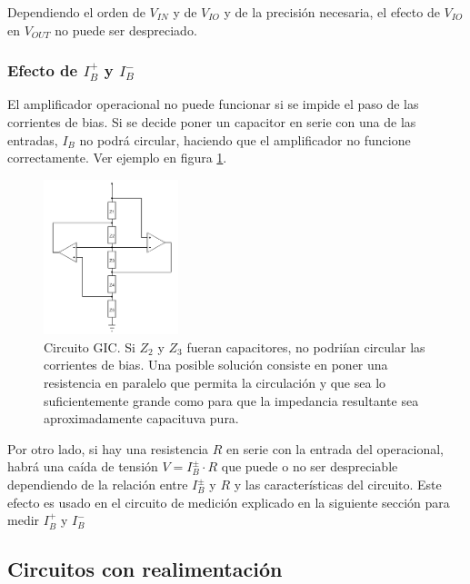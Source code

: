 \documentclass[../../main.tex]{subfiles}
\begin{document}
Dependiendo el orden de $V_{IN}$ y de $V_{IO}$ y de la precisi\'on necesaria, el efecto de $V_{IO}$ en $V_{OUT}$ no puede ser despreciado.

\subsubsection*{Efecto de $I_B^+$ y $I_B^-$}
El amplificador operacional no puede funcionar si se impide el paso de las corrientes de bias. Si se decide poner un capacitor en serie con una de las entradas, $I_B$ no podr\'a circular, haciendo que el amplificador no funcione correctamente. Ver ejemplo en figura \ref{fig:ej_3_GIC}. 

\begin{figure}[htb] %
	\centering
	\includegraphics[width=0.35\textwidth]{imagenes/gic.png}
	\caption[Capacitores en un GIC]{Circuito GIC. Si $Z_2$ y $Z_3$ fueran capacitores, no podri\'ian circular las corrientes de bias. Una posible soluci\'on consiste en poner una resistencia en paralelo que permita la circulaci\'on y que sea lo suficientemente grande como para que la impedancia resultante sea aproximadamente capacituva pura.}
	\label{fig:ej_3_GIC}
\end{figure}


Por otro lado, si hay una resistencia $R$ en serie con la entrada del operacional, habr\'a una ca\'ida de tensi\'on $V=I_B^\pm\cdot R$ que puede o no ser despreciable dependiendo de la relaci\'on entre $I_B^\pm$ y $R$ y las caracter\'isticas del circuito. Este efecto es usado en el circuito de medici\'on explicado en la siguiente secci\'on para medir $I_B^+$ y $I_B^-$








\subsection{Circuitos con realimentaci\'on}	\label{ssec:realimentacion}
\end{document}
